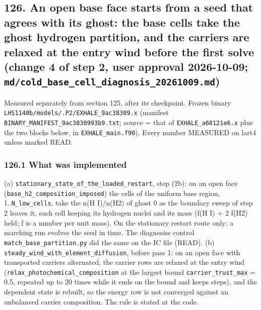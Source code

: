 \documentclass[english,a4paper]{my_memo}
\begin{document}
\subsection{\texorpdfstring{126. An open base face starts from a seed that agrees with its ghost: the base cells take the ghost hydrogen partition, and the carriers are relaxed at the entry wind before the first solve (change 4 of step 2, user approval 2026-10-09; \texttt{md/cold\_base\_cell\_diagnosis\_20261009.md})}{126. An open base face starts from a seed that agrees with its ghost: the base cells take the ghost hydrogen partition, and the carriers are relaxed at the entry wind before the first solve (change 4 of step 2, user approval 2026-10-09; md/cold\_base\_cell\_diagnosis\_20261009.md)}}\label{126-an-open-base-face-starts-from-a-seed-that-agrees-with-its-ghost-the-base-cells-take-the-ghost-hydrogen-partition-and-the-carriers-are-relaxed-at-the-entry-wind-before-the-first-solve-change-4-of-step-2-user-approval-2026-10-09-mdcold_base_cell_diagnosis_20261009md}

Measured separately from section 125, after its checkpoint. Frozen binary \texttt{LHS1140b/models/.P2/EXHALE\_9ac38309.x} (manifest \texttt{BINARY\_MANIFEST\_9ac3830993b9.txt}; source = that of \texttt{EXHALE\_a68121e6.x} plus the two blocks below, in \texttt{EXHALE\_main.f90}). Every number MEASURED on lart4 unless marked READ.

\subsubsection{126.1 What was implemented}\label{1261-what-was-implemented}

(a) \texttt{stationary\_state\_of\_the\_loaded\_restart}, step (2b): on an open face (\texttt{base\_h2\_composition\_imposed}) the cells of the uniform base region, 1..\texttt{N\_low\_cells}, take the n(H I)/n(H2) of ghost 0 as the boundary sweep of step 2 leaves it, each cell keeping its hydrogen nuclei and its mass (f(H I) + 2 f(H2) held; f is a number per unit mass). On the stationary restart route only: a marching run evolves the seed in time. The diagnosis\textquotesingle s control \texttt{match\_base\_partition.py} did the same on the IC file (READ).
(b) \texttt{steady\_wind\_with\_element\_diffusion}, before pass 1: on an open face with transported carriers alternated, the carrier rows are relaxed at the entry wind (\texttt{relax\_photochemical\_composition} at the largest bound \texttt{carrier\_trust\_max} = 0.5, repeated up to 20 times while it ends on the bound and keeps steps), and the dependent state is rebuilt, so the energy row is not converged against an unbalanced carrier composition. The rule is stated at the code.
\end{document}
